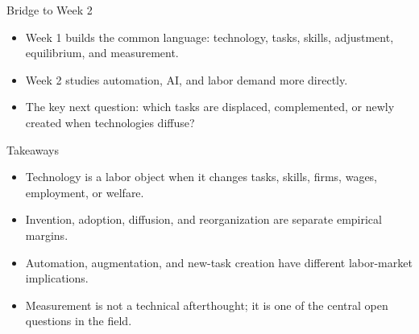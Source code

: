 \documentclass[aspectratio=169,11pt]{beamer}
\begin{document}
\begin{frame}{Bridge to Week 2}
\begin{itemize}
    \item Week 1 builds the common language: technology, tasks, skills, adjustment, equilibrium, and measurement.
    \item Week 2 studies automation, AI, and labor demand more directly.
    \item The key next question: which tasks are displaced, complemented, or newly created when technologies diffuse?
\end{itemize}
\end{frame}

\begin{frame}{Takeaways}
\begin{itemize}
    \item Technology is a labor object when it changes tasks, skills, firms, wages, employment, or welfare.
    \item Invention, adoption, diffusion, and reorganization are separate empirical margins.
    \item Automation, augmentation, and new-task creation have different labor-market implications.
    \item Measurement is not a technical afterthought; it is one of the central open questions in the field.
\end{itemize}
\end{frame}
\end{document}
